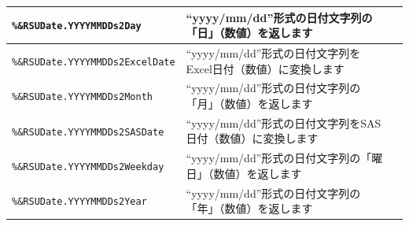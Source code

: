 \begin{center}
{\begin{xltabular}{\textwidth}{|p{4truecm}|X|p{1.2truecm}|}
\hline
\texttt{\%\&RSUDate.YYYYMMDDs2Day}&``yyyy/mm/dd''形式の日付文字列の「日」（数値）を返します&\\
\hline
\texttt{\%\&RSUDate.YYYYMMDDs2ExcelDate}&``yyyy/mm/dd''形式の日付文字列をExcel日付（数値）に変換します&\\
\hline
\texttt{\%\&RSUDate.YYYYMMDDs2Month}&``yyyy/mm/dd''形式の日付文字列の「月」（数値）を返します&\\
\hline
\texttt{\%\&RSUDate.YYYYMMDDs2SASDate}&``yyyy/mm/dd''形式の日付文字列をSAS日付（数値）に変換します&\\
\hline
\texttt{\%\&RSUDate.YYYYMMDDs2Weekday}&``yyyy/mm/dd''形式の日付文字列の「曜日」（数値）を返します&\\
\hline
\texttt{\%\&RSUDate.YYYYMMDDs2Year}&``yyyy/mm/dd''形式の日付文字列の「年」（数値）を返します&\\
\hline
\end{xltabular}
}
\end{center}
